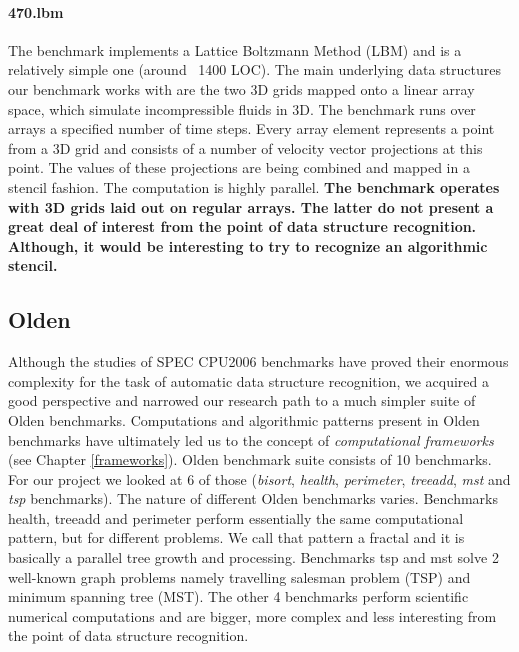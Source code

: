 \paragraph{470.lbm} The benchmark implements a Lattice Boltzmann Method (LBM) and is a relatively simple one (around ~1400 LOC). The main underlying data structures our benchmark works with are the two 3D grids mapped onto a linear array space, which simulate incompressible fluids in 3D. The benchmark runs over arrays a specified number of time steps. Every array element represents a point from a 3D grid and consists of a number of velocity vector projections at this point. The values of these projections are being combined and mapped in a stencil fashion. The computation is highly parallel.\newline\null
\quad\textbf{The benchmark operates with 3D grids laid out on regular arrays. The latter do not present a great deal of interest from the point of data structure recognition. Although, it would be interesting to try to recognize an algorithmic stencil.}
\subsection{Olden}
\label{background_benchmarks_olden}
\quad Although the studies of SPEC CPU2006 benchmarks have proved their enormous complexity for the task of automatic data structure recognition, we acquired a good perspective and narrowed our research path to a much simpler suite of Olden benchmarks. Computations and algorithmic patterns present in Olden benchmarks have ultimately led us to the concept of \textit{computational frameworks} (see Chapter \ref{frameworks}).\newline\null
\quad Olden benchmark suite consists of 10 benchmarks. For our project we looked at 6 of those (\textit{bisort}, \textit{health}, \textit{perimeter}, \textit{treeadd}, \textit{mst} and \textit{tsp} benchmarks). The nature of different Olden benchmarks varies. Benchmarks health, treeadd and perimeter perform essentially the same computational pattern, but for different problems. We call that pattern a fractal and it is basically a parallel tree growth and processing. Benchmarks tsp and mst solve 2 well-known graph problems namely travelling salesman problem (TSP) and minimum spanning tree (MST). The other 4 benchmarks perform scientific numerical computations and are bigger, more complex and less interesting from the point of data structure recognition.
